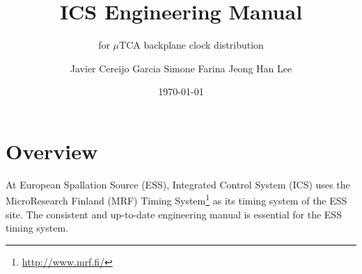 \documentclass[11pt
  , a4paper
  , article
  , oneside
  , showtrims
]{memoir}
\begin{document}
%

%

%
\date{\today}

%

%

%

%
\title{ICS Engineering Manual}
\subtitle{for $\mu$TCA backplane clock distribution}
\author{Javier Cereijo Garcia \newline Simone Farina \newline Jeong Han Lee}





\showtrimson

\esstitle
\newpage
\tableofcontents
\newpage



\chapter{Overview}
At European Spallation Source (ESS), Integrated Control System (ICS) uses the MicroResearch Finland (MRF) Timing System{\footnote{\url{http://www.mrf.fi/}}} as its timing system of the ESS site. The consistent and up-to-date engineering manual is essential for the ESS timing system.\\
\end{document}
